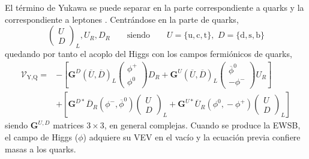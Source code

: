 El término de Yukawa se puede separar en la parte correspondiente a quarks y la correspondiente a leptones
. Centrándose en la parte de quarks,
\begin{equation}
  \begin{pmatrix}
    U\\ D
  \end{pmatrix}_L, U_R, D_R \qquad \text{siendo} \qquad U=\{\mathrm{u,c,t}\},\,\,D=\{\mathrm{d,s,b}\}  
\end{equation}
quedando por tanto el acoplo del Higgs con los campos fermiónicos de quarks,
\begin{equation}
\begin{split}
\mathcal{V}_{\text{Y,Q}}  = & 
- \left[\mathbf{G}^D \left(\overline{U},\!\overline{D} \right)_L \begin{pmatrix}
  \phi^+ \\ \phi^0
\end{pmatrix} D_R + 
\mathbf{G}^U \left(\overline{U},\!\overline{D} \right)_L \begin{pmatrix}
  \overline{\phi}^0 \\ -\phi^-
\end{pmatrix} U_R \right] \\ & +
%
%
\left[\mathbf{G}^{D*} \overline{D}_R\left(\phi^-,\!\overline{\phi}^0 \right) \begin{pmatrix}
  U \\ D
\end{pmatrix}_L + 
\mathbf{G}^{U*} \overline{U}_R \left(\phi^0,\!-\phi^+ \right) \begin{pmatrix}
  U \\ D
\end{pmatrix}_L \right]
\end{split}
\end{equation}
siendo $\mathbf{G}^{U,D}$ matrices $3\times3$, en general complejas. Cuando se produce la EWSB, el campo de Higgs ($\phi$) adquiere su VEV en el vacío y la ecuación previa confiere masas a los quarks. 

